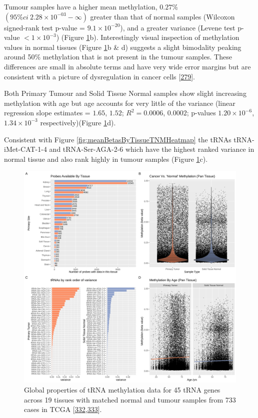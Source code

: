 \documentclass[
]{book}
\begin{document}
Tumour samples have a higher mean methylation, \(0.27\%\) \((95\% ci~ 2.28\times10^{-03}-\infty)\) greater than that of normal samples (Wilcoxon signed-rank test p-value = \(9.1\times10^{-20}\)), and a greater variance (Levene test p-value \(< 1\times10^{-3}\)) (Figure \ref{fig:cancerVsNormalCombinedPlots}b).
Interestingly visual inspection of methylation values in normal tissues (Figure \ref{fig:cancerVsNormalCombinedPlots}b \& d) suggests a slight bimodality peaking around 50\% methylation that is not present in the tumour samples.
These differences are small in absolute terms and have very wide error margins but are consistent with a picture of dysregulation in cancer cells {[}\protect\hyperlink{ref-Huang2018}{279}{]}.

Both Primary Tumour and Solid Tissue Normal samples show slight increasing methylation with age but age accounts for very little of the variance (linear regression slope estimates = \(1.65\), \(1.52\); \(R^2= 0.0006\), \(0.0002\); p-values \(1.20\times10^{-6}\), \(1.34\times10^{-3}\) respectively)(Figure \ref{fig:cancerVsNormalCombinedPlots}d).

Consistent with Figure \ref{fig:meanBetasByTissueTNMHeatmap} the tRNAs tRNA-iMet-CAT-1-4 and tRNA-Ser-AGA-2-6 which have the highest ranked variance in normal tissue and also rank highly in tumour samples (Figure \ref{fig:cancerVsNormalCombinedPlots}c).

\begin{figure}

{\centering \includegraphics[width=1\linewidth]{./figs/cancerVsNormalCombinedPlots} 

}

\caption{Global properties of tRNA methylation data for 45 tRNA genes across 19 tissues with matched normal and tumour samples from 733 cases in TCGA {[}\protect\hyperlink{ref-Yang2016}{332},\protect\hyperlink{ref-Nazor2012}{333}{]}.}\label{fig:cancerVsNormalCombinedPlots}
\end{figure}
\end{document}
